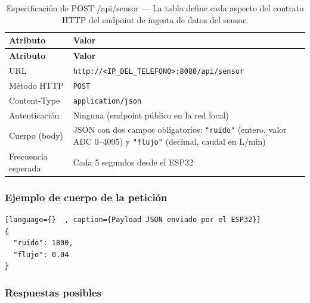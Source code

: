 \documentclass[12pt,a4paper]{article}
\begin{document}
\begin{longtable}{p{3cm} p{10.5cm}}
\caption{Especificación de POST /api/sensor --- La tabla define cada aspecto del contrato
  HTTP del endpoint de ingesta de datos del sensor.}
\label{tab:spec-post} \\
\toprule
\textbf{Atributo} & \textbf{Valor} \\
\midrule
\endfirsthead
\toprule
\textbf{Atributo} & \textbf{Valor} \\
\midrule
\endhead
\bottomrule
\endlastfoot
URL & \texttt{http://<IP\_DEL\_TELEFONO>:8080/api/sensor} \\[0.5em]
Método HTTP & \texttt{POST} \\[0.5em]
Content-Type & \texttt{application/json} \\[0.5em]
Autenticación & Ninguna (endpoint público en la red local) \\[0.5em]
Cuerpo (body) & JSON con dos campos obligatorios:
  \texttt{"ruido"} (entero, valor ADC 0--4095) y
  \texttt{"flujo"} (decimal, caudal en L/min) \\[0.5em]
Frecuencia esperada & Cada 5 segundos desde el ESP32 \\
\end{longtable}

\subsubsection{Ejemplo de cuerpo de la petición}

\begin{lstlisting}[language={}  , caption={Payload JSON enviado por el ESP32}]
{
  "ruido": 1800,
  "flujo": 0.04
}
\end{lstlisting}

\subsubsection{Respuestas posibles}
\end{document}
